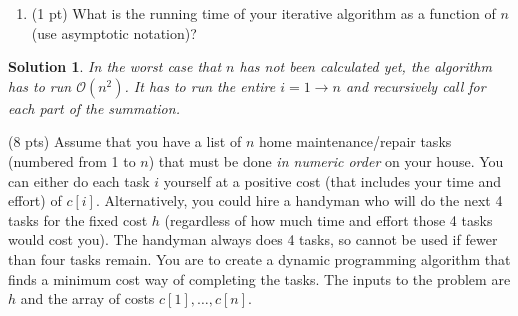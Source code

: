 \documentclass[11pt]{article}
\newtheorem*{solution}{Solution}
\begin{document}
\begin{enumerate}
\begin{enumerate}
\item (1 pt) What is the running time of your iterative algorithm as a function of $n$ (use asymptotic notation)?
\end{enumerate}
\begin{solution}
    \item In the worst case that $n$ has not been calculated yet, the algorithm has to run $\mathcal{O}(n^2)$. It has to run the entire $i=1 \rightarrow n$ and recursively call for each part of the 
          summation. 
\end{solution}
\newpage
\item (8  pts) Assume that you have a list of $n$ home maintenance/repair tasks (numbered from 1 to $n$) that must be done \emph{in numeric order} on your house.  
 You can either do each task $i$ yourself at a positive cost (that includes your time and effort) of $c[i]$.  
 Alternatively, you could hire a handyman who will do the next 4 tasks for the fixed cost $h$ (regardless of how much time and effort those 4 tasks would  cost you).  
 The handyman always does 4 tasks, so cannot be used if fewer than four tasks remain.
You are to create a dynamic programming algorithm that finds a minimum cost way of completing the tasks.
The inputs to the problem are $h$ and the array of costs $c[1], \ldots, c[n]$.


\end{enumerate}
\end{document}
